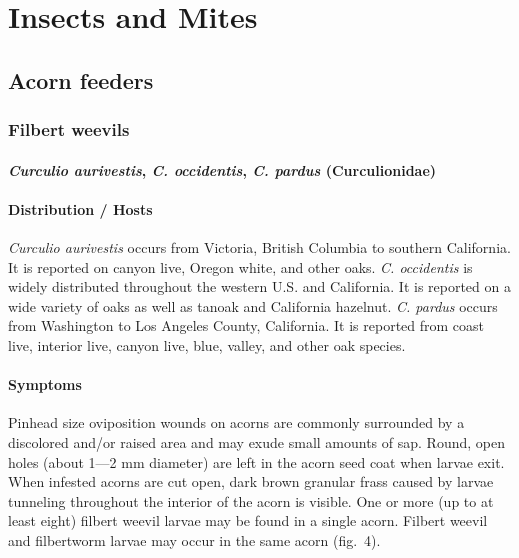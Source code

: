 \documentclass[
]{book}
\begin{document}
\part{Insects and Mites}\label{part-insects-and-mites}

\chapter*{Acorn feeders}\label{acorn-feeders}

\section{Filbert weevils}\label{filbert-weevils}

\subsection*{\texorpdfstring{\emph{Curculio aurivestis}, \emph{C. occidentis}, \emph{C. pardus} (Curculionidae)}{Curculio aurivestis, C. occidentis, C. pardus (Curculionidae)}}\label{curculio-aurivestis-c.-occidentis-c.-pardus-curculionidae}

\subsection*{Distribution / Hosts}\label{distribution-hosts}

\emph{Curculio aurivestis} occurs from Victoria, British Columbia to southern California. It is reported on canyon live, Oregon white, and other oaks.
\emph{C. occidentis} is widely distributed throughout the western U.S. and California. It is reported on a wide variety of oaks as well as tanoak and California hazelnut.
\emph{C. pardus} occurs from Washington to Los Angeles County, California. It is reported from coast live, interior live, canyon live, blue, valley, and other oak species.

\subsection*{Symptoms}\label{symptoms}

Pinhead size oviposition wounds on acorns are commonly surrounded by a discolored and/or raised area and may exude small amounts of sap. Round, open holes (about 1---2 mm diameter) are left in the acorn seed coat when larvae exit. When infested acorns are cut open, dark brown granular frass caused by larvae tunneling throughout the interior of the acorn is visible. One or more (up to at least eight) filbert weevil larvae may be found in a single acorn. Filbert weevil and filbertworm larvae may occur in the same acorn (fig.~4).
\end{document}
